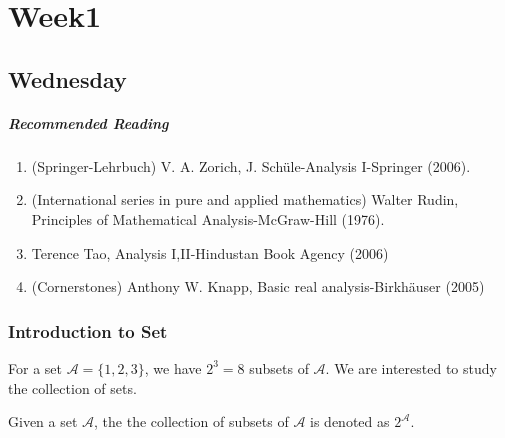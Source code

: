 
\chapter{Week1}

\section{Wednesday}
 
\paragraph{Recommended Reading}
\begin{enumerate}
\item
(Springer-Lehrbuch) V. A. Zorich, J. Schüle-Analysis I-Springer (2006).
\item
(International series in pure and applied mathematics) Walter Rudin, Principles of Mathematical Analysis-McGraw-Hill (1976).
\item
Terence Tao, Analysis I,II-Hindustan Book Agency (2006)
\item
(Cornerstones) Anthony W. Knapp, Basic real analysis-Birkhäuser (2005)
\end{enumerate}
\subsection{Introduction to Set}
For a set $\mathcal{A}=\{1,2,3\}$, we have $2^3=8$ subsets of $\mathcal{A}$. We are interested to study the collection of sets.
\begin{definition}
Given a set $\mathcal{A}$, the the collection of subsets of $\mathcal{A}$ is denoted as $2^{\mathcal{A}}$.
\end{definition}

